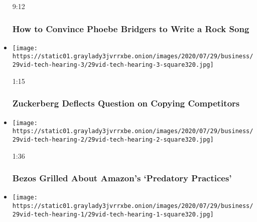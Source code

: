 \begin{itemize}
  9:12

  \hypertarget{how-to-convince-phoebe-bridgers-to-write-a-rock-song}{%
  \subsubsection{How to Convince Phoebe Bridgers to Write a Rock
  Song}\label{how-to-convince-phoebe-bridgers-to-write-a-rock-song}}
\item
  \href{https://www.nytimes3xbfgragh.onion/video/us/politics/100000007263272/zuckerberg-jayapal-facebook.html?action=click\&module=video-series-bar\&region=header\&pgtype=Article\&playlistId=video/latest-video}{}

  \texttt{[image: https://static01.graylady3jvrrxbe.onion/images/2020/07/29/business/29vid-tech-hearing-3/29vid-tech-hearing-3-square320.jpg]}

  1:15

  \hypertarget{zuckerberg-deflects-question-on-copying-competitors}{%
  \subsubsection{Zuckerberg Deflects Question on Copying
  Competitors}\label{zuckerberg-deflects-question-on-copying-competitors}}
\item
  \href{https://www.nytimes3xbfgragh.onion/video/us/100000007263183/bezos-amazon-predatory-practices.html?action=click\&module=video-series-bar\&region=header\&pgtype=Article\&playlistId=video/latest-video}{}

  \texttt{[image: https://static01.graylady3jvrrxbe.onion/images/2020/07/29/business/29vid-tech-hearing-2/29vid-tech-hearing-2-square320.jpg]}

  1:36

  \hypertarget{bezos-grilled-about-amazons-predatory-practices}{%
  \subsubsection{Bezos Grilled About Amazon's `Predatory
  Practices'}\label{bezos-grilled-about-amazons-predatory-practices}}
\item
  \href{https://www.nytimes3xbfgragh.onion/video/us/politics/100000007263148/google-data-privacy.html?action=click\&module=video-series-bar\&region=header\&pgtype=Article\&playlistId=video/latest-video}{}

  \texttt{[image: https://static01.graylady3jvrrxbe.onion/images/2020/07/29/business/29vid-tech-hearing-1/29vid-tech-hearing-1-square320.jpg]}


\end{itemize}
